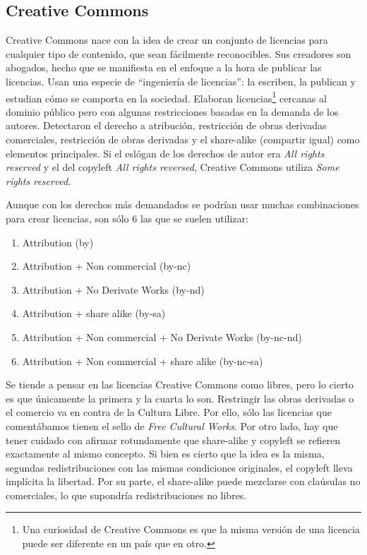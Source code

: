 \subsection{Creative Commons}
\label{sub:creative}
Creative Commons nace con la idea de crear un conjunto de licencias
para cualquier tipo de contenido, que sean fácilmente
reconocibles. Sus creadores son abogados, hecho que se manifiesta en
el enfoque a la hora de publicar las licencias. Usan una especie de
``ingeniería de licencias'': la escriben, la publican y estudian cómo
se comporta en la sociedad. Elaboran licencias\footnote{Una curiosidad
  de Creative Commons es que la misma versión de una licencia puede
  ser diferente en un país que en otro.} cercanas al dominio público
pero con algunas restricciones basadas en la demanda de los
autores. Detectaron el derecho a atribución, restricción de obras
derivadas comerciales, restricción de obras derivadas y el share-alike
(compartir igual) como elementos principales. Si el eslógan de los
derechos de autor era \emph{All rights reserved} y el del copyleft
\emph{All rights reversed}, Creative Commons utiliza \emph{Some rights
  reserved}.

Aunque con los derechos más demandados se podrían usar muchas
combinaciones para crear licencias, son sólo 6 las que se suelen
utilizar:
\begin{enumerate}
\item Attribution (by)
\item Attribution + Non commercial (by-nc)
\item Attribution + No Derivate Works (by-nd)
\item Attribution + share alike (by-sa)
\item Attribution + Non commercial + No Derivate Works (by-nc-nd)
\item Attribution + Non commercial + share alike (by-nc-sa)
\end{enumerate}
Se tiende a pensar en las licencias Creative Commons como libres, pero
lo cierto es que únicamente la primera y la cuarta lo son. Restringir
las obras derivadas o el comercio va en contra de la Cultura
Libre. Por ello, sólo las licencias que comentábamos tienen el sello
de \emph{Free Cultural Works}. Por otro lado, hay que tener cuidado
con afirmar rotundamente que share-alike y copyleft se refieren
exactamente al mismo concepto. Si bien es cierto que la idea es la
misma, segundas redistribuciones con las mismas condiciones
originales, el copyleft lleva implícita la libertad. Por su parte, el
share-alike puede mezclarse con claúsulas no comerciales, lo que
supondría redistribuciones no libres.


